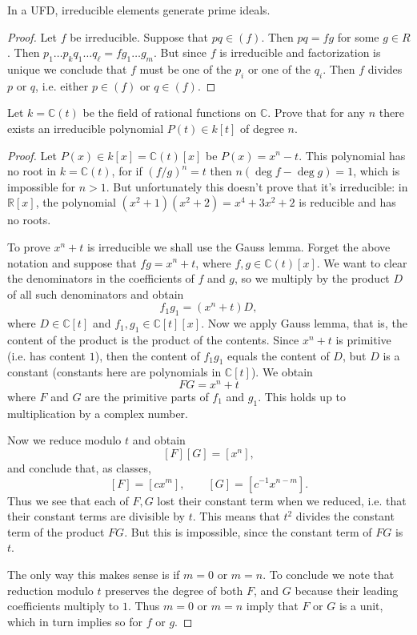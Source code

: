 \begin{lemma}
\label{lemma-ufd-irred-eleme-%
gener-prime}
In a UFD, irreducible elements generate prime
ideals.
\end{lemma}

\begin{proof}
Let $f$ be irreducible. Suppose that
$pq\in(f)$. Then $pq=fg$ for some  $g\in
R$. Then $p_1\ldots p_kq_1\ldots
q_\ell=fg_1\ldots g_m$. But since $f$ is
irreducible and factorization is unique we
conclude that $f$ must be one of the
 $p_i$ or one of the $q_i$. Then $f$ divides
 $p$ or $q$, i.e. either $p\in(f)$
or $q\in(f)$.
\end{proof}

\begin{exercise}
\label{exercise-rational-functions-irreducible}
Let $k=\mathbb{C}(t)$ be the field of
rational functions on $\mathbb{C}$.
Prove that for any $n$ there exists
an irreducible polynomial
$P(t) \in k[t]$ of degree $n$.
\end{exercise}

\begin{proof}
Let $P(x) \in k[x]=\mathbb{C}(t)[x]$
be $P(x) = x^n-t$.
This polynomial has no root in
$k=\mathbb{C}(t)$,
for if $(f/g)^n=t$ then 
$n(\operatorname{deg}f-
\operatorname{deg}g)=1$,
which is impossible for $n>1$.
But unfortunately this doesn't prove
that it's irreducible: in $\mathbb{R}[x]$,
the polynomial
$(x^2 + 1)(x^2+2)=x^4+3x^2+2$
is reducible and has no roots.

To prove $x^n + t$ is irreducible we shall
use the Gauss lemma. Forget the above
notation and suppose that
$fg = x^n + t$, where
$f,g \in \mathbb{C}(t)[x]$.
We want to clear the denominators in
the coefficients of $f$ and $g$,
so we multiply by the product $D$ of all
such denominators and obtain
$$
f_1g_1 = (x^n + t)D,
$$
where $D \in \mathbb{C}[t]$ and
$f_1,g_1 \in \mathbb{C}[t][x]$.
Now we apply Gauss lemma, that is, the
content of the product is the product
of the contents. Since $x^n +t$ is primitive
(i.e. has content $1$), then the
content of $f_1g_1$ equals the content
of $D$, but $D$ is a constant
(constants here are polynomials in
$\mathbb{C}[t]$).
We obtain
$$
FG = x^n + t
$$
where $F$ and $G$ are the primitive parts
of $f_1$ and $g_1$. This holds up to
multiplication by a complex number.

Now we reduce modulo $t$ and obtain
$$
[F][G] = [x^n],
$$
and conclude that, as classes,
$$
[F]=[cx^m],\qquad 
[G]=[c^{-1}x^{n-m}].
$$
Thus we see that each of $F,G$
lost their constant term when we reduced,
i.e. that their constant terms are divisible
by $t$. This means that $t^2$ divides
the constant term of the product $FG$.
But this is impossible, since the constant
term of $FG$ is $t$. 

The only way
this makes sense is if $m=0$ or $m=n$.
To conclude we note that reduction modulo
$t$ preserves the degree of both $F$, and 
$G$ because their leading coefficients
multiply to $1$. Thus $m=0$ or $m=n$
imply that $F$ or $G$ is a unit, which
in turn implies so for $f$ or $g$.
\end{proof}


